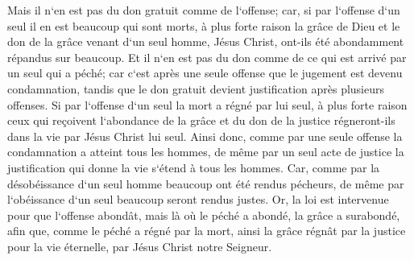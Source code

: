 \verse Mais il n`en est pas du don gratuit comme de l`offense; car, si par l`offense d`un seul il en est beaucoup qui sont morts, à plus forte raison la grâce de Dieu et le don de la grâce venant d`un seul homme, Jésus Christ, ont-ils été abondamment répandus sur beaucoup. 
\verse Et il n`en est pas du don comme de ce qui est arrivé par un seul qui a péché; car c`est après une seule offense que le jugement est devenu condamnation, tandis que le don gratuit devient justification après plusieurs offenses. 
\verse Si par l`offense d`un seul la mort a régné par lui seul, à plus forte raison ceux qui reçoivent l`abondance de la grâce et du don de la justice régneront-ils dans la vie par Jésus Christ lui seul. 
\verse Ainsi donc, comme par une seule offense la condamnation a atteint tous les hommes, de même par un seul acte de justice la justification qui donne la vie s`étend à tous les hommes. 
\verse Car, comme par la désobéissance d`un seul homme beaucoup ont été rendus pécheurs, de même par l`obéissance d`un seul beaucoup seront rendus justes. 
\verse Or, la loi est intervenue pour que l`offense abondât, mais là où le péché a abondé, la grâce a surabondé, 
\verse afin que, comme le péché a régné par la mort, ainsi la grâce régnât par la justice pour la vie éternelle, par Jésus Christ notre Seigneur. 

